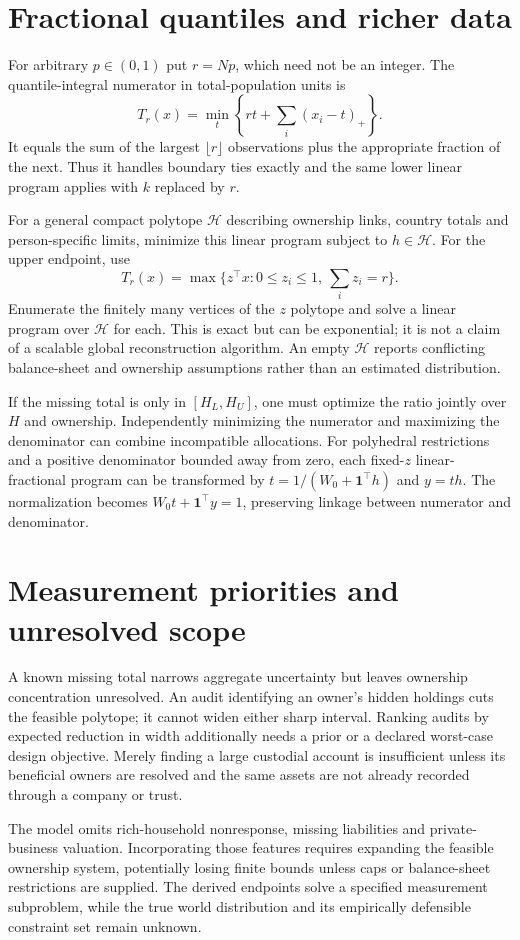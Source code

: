 \documentclass[11pt]{article}
\begin{document}
\section*{Fractional quantiles and richer data}
For arbitrary $p\in(0,1)$ put $r=Np$, which need not be an integer. The quantile-integral numerator in total-population units is
\[
 T_r(x)=\min_t\left\{rt+\sum_i(x_i-t)_+\right\}.
\]
It equals the sum of the largest $\lfloor r\rfloor$ observations plus the appropriate fraction of the next. Thus it handles boundary ties exactly and the same lower linear program applies with $k$ replaced by $r$.

For a general compact polytope $\mathcal H$ describing ownership links, country totals and person-specific limits, minimize this linear program subject to $h\in\mathcal H$. For the upper endpoint, use
\[
 T_r(x)=\max\{z^\top x:0\leq z_i\leq1,\ \sum_i z_i=r\}.
\]
Enumerate the finitely many vertices of the $z$ polytope and solve a linear program over $\mathcal H$ for each. This is exact but can be exponential; it is not a claim of a scalable global reconstruction algorithm. An empty $\mathcal H$ reports conflicting balance-sheet and ownership assumptions rather than an estimated distribution.

If the missing total is only in $[H_L,H_U]$, one must optimize the ratio jointly over $H$ and ownership. Independently minimizing the numerator and maximizing the denominator can combine incompatible allocations. For polyhedral restrictions and a positive denominator bounded away from zero, each fixed-$z$ linear-fractional program can be transformed by $t=1/(W_0+\mathbf1^\top h)$ and $y=th$. The normalization becomes $W_0t+\mathbf1^\top y=1$, preserving linkage between numerator and denominator.

\section*{Measurement priorities and unresolved scope}
A known missing total narrows aggregate uncertainty but leaves ownership concentration unresolved. An audit identifying an owner's hidden holdings cuts the feasible polytope; it cannot widen either sharp interval. Ranking audits by expected reduction in width additionally needs a prior or a declared worst-case design objective. Merely finding a large custodial account is insufficient unless its beneficial owners are resolved and the same assets are not already recorded through a company or trust.

The model omits rich-household nonresponse, missing liabilities and private-business valuation. Incorporating those features requires expanding the feasible ownership system, potentially losing finite bounds unless caps or balance-sheet restrictions are supplied. The derived endpoints solve a specified measurement subproblem, while the true world distribution and its empirically defensible constraint set remain unknown.
\end{document}
